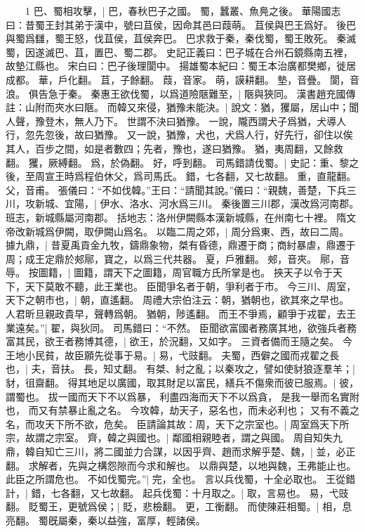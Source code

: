 　　1 巴、蜀相攻擊，|{
	巴，春秋巴子之國。
	蜀，蠶叢、魚鳧之後。
	華陽國志曰：昔蜀王封其弟于漢中，號曰苴侯，因命其邑曰葭萌。
	苴侯與巴王爲好。
	後巴與蜀爲讎，蜀王怒，伐苴侯，苴侯奔巴。
	巴求救于秦，秦伐蜀，蜀王敗死。
	秦滅蜀，因遂滅巴、苴，置巴、蜀二郡。
	史記正義曰：巴子城在合州石鏡縣南五裡，故墊江縣也。
	宋白曰：巴子後理閬中。
	揚雄蜀本紀曰：蜀王本治廣都樊鄉，徙居成都。
	華，戶化翻。
	苴，子餘翻。
	葭，音家。
	萌，謨耕翻。
	墊，音疊。
	閬，音浪。
}
俱告急于秦。
	秦惠王欲伐蜀，以爲道險陿難至，|{
	陿與狹同。
	漢書趙充國傳註：山附而夾水曰陿。
}
而韓又來侵，猶豫未能決。|{
	說文：猶，玃屬，居山中；聞人聲，豫登木，無人乃下。
	世謂不決曰猶豫。
	一說，隴西謂犬子爲猶，犬導人行，忽先忽後，故曰猶豫。
	又一說，猶豫，犬也，犬爲人行，好先行，卻住以俟其人，百步之間，如是者數四；先者，豫也，遂曰猶豫。
	猶，夷周翻，又餘救翻。
	玃，厥縛翻。
	爲，於偽翻。
	好，呼到翻。
}
司馬錯請伐蜀。|{
	史記：重、黎之後，至周宣王時爲程伯休父，爲司馬氏。
	錯，七各翻，又七故翻。
	重，直龍翻。
	父，音甫。
}
張儀曰：“不如伐韓。”王曰：“請聞其說。”儀曰：“親魏，善楚，下兵三川，攻新城、宜陽，|{
	伊水、洛水、河水爲三川。
	秦後置三川郡，漢改爲河南郡。
	班志，新城縣屬河南郡。
	括地志：洛州伊闕縣本漢新城縣，在州南七十裡。
	隋文帝改新城爲伊闕，取伊闕山爲名。
}
以臨二周之郊，|{
	周分爲東、西，故曰二周。
}
據九鼎，|{
	昔夏禹貢金九牧，鑄鼎象物，桀有昏德，鼎遷于商；商紂暴虐，鼎遷于周；成王定鼎於郟鄏，寶之，以爲三代共器。
	夏，戶雅翻。
	郟，音夾。
	鄏，音辱。
}
按圖籍，|{
	圖籍，謂天下之圖籍，周官職方氏所掌是也。
}
挾天子以令于天下，天下莫敢不聽，此王業也。
	臣聞爭名者于朝，爭利者于市。
	今三川、周室，天下之朝市也，|{
	朝，直遙翻。
	周禮大宗伯注云：朝，猶朝也，欲其來之早也。
	人君昕旦親政貴早，聲轉爲朝。
	猶朝，陟遙翻。
}
而王不爭焉，顧爭于戎翟，去王業遠矣。”|{
	翟，與狄同。
}
司馬錯曰：“不然。
	臣聞欲富國者務廣其地，欲強兵者務富其民，欲王者務博其德，|{
	欲王，於況翻，又如字。
}
三資者備而王隨之矣。
	今王地小民貧，故臣願先從事于易。|{
	易，弋豉翻。
}
夫蜀，西僻之國而戎翟之長也，|{
	夫，音扶。
	長，知丈翻。
}
有桀、紂之亂；以秦攻之，譬如使豺狼逐羣羊；|{
	豺，徂齋翻。
}
得其地足以廣國，取其財足以富民，繕兵不傷衆而彼已服焉。|{
	彼，謂蜀也。
}
拔一國而天下不以爲暴，
利盡四海而天下不以爲貪，
是我一舉而名實附也，
而又有禁暴止亂之名。
今攻韓，劫天子，惡名也，而未必利也；
又有不義之名，而攻天下所不欲，危矣。
臣請論其故：周，天下之宗室也。|{
	周室爲天下所宗，故謂之宗室。
}
齊，韓之與國也。|{
	鄰國相親睦者，謂之與國。
}
周自知失九鼎，韓自知亡三川，將二國並力合謀，以因乎齊、趙而求解乎楚、魏，|{
	並，必正翻。
	求解者，先與之構怨隙而今求和解也。
}
以鼎與楚，以地與魏，王弗能止也。
	此臣之所謂危也。
	不如伐蜀完。”|{
	完，全也。
	言以兵伐蜀，十全必取也。
}
王從錯計，|{
	錯，七各翻，又七故翻。
}
起兵伐蜀：十月取之。|{
	取，言易也。
	易，弋豉翻。
}
貶蜀王，更號爲侯；|{
	貶，悲檢翻。
	更，工衡翻。
}
而使陳莊相蜀。|{
	相，息亮翻。
}
蜀旣屬秦，秦以益強，富厚，輕諸侯。


